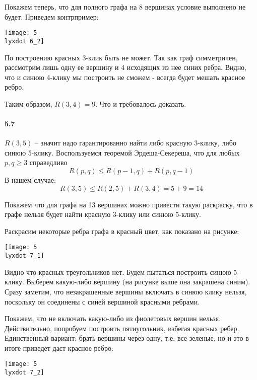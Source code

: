 \documentclass[russian]{article}
\newcommand{\lyxdot}{.}
\begin{document}
Покажем теперь, что для полного графа на 8 вершинах условие выполнено
не будет. Приведем контрпример:

\begin{center}
\texttt{[image: 5\\lyxdot 6\_2]}
\par\end{center}

По построению красных 3-клик быть не может. Так как граф симметричен,
рассмотрим лишь одну ее вершину и 4 исходящих из нее синих ребра.
Видно, что и синюю 4-клику мы построить не сможем - всегда будет мешать
красное ребро.

Таким образом, $R(3,4)=9$. Что и требовалось доказать.


\paragraph{5.7}

$R(3,5)$ -- значит надо гарантированно найти либо красную 3-клику,
либо синюю 5-клику. Воспользуемся теоремой Эрдеша-Секереша, что для
любых $p,q\geqslant3$ справедливо 
\[
R(p,q)\leqslant R(p-1,q)+R(p,q-1)
\]
В нашем случае:
\[
R(3,5)\leqslant R(2,5)+R(3,4)=5+9=14
\]


Покажем что для графа на 13 вершинах можно привести такую раскраску,
что в графе нельзя будет найти красную 3-клику или синюю 5-клику.

Раскрасим некоторые ребра графа в красный цвет, как показано на рисунке:

\begin{center}
\texttt{[image: 5\\lyxdot 7\_1]}
\par\end{center}

Видно что красных треугольников нет. Будем пытаться построить синюю
5-клику. Выберем какую-либо вершину (на рисунке выше она закрашена
синим). Сразу заметим, что незакрашенные вершины включать в синюю
клику нельзя, поскольку он соединены с синей вершиной красными ребрами.

Покажем, что не включать какую-либо из фиолетовых вершин нельзя. Действительно,
попробуем построить пятиугольник, избегая красных ребер. Единственный
вариант: брать вершины через одну, т.е. все зеленые, но и это в итоге
приведет даст красное ребро:

\begin{center}
\texttt{[image: 5\\lyxdot 7\_2]}
\par\end{center}
\end{document}
